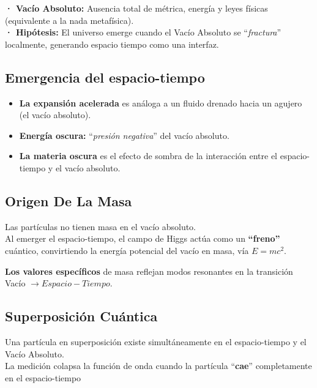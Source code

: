 \documentclass[a4paper]{article}
\theoremstyle{definition}
\theoremstyle{remark}
\numberwithin{equation}{section}
\begin{document}
	\textbf{· Vacío Absoluto:} Ausencia total de métrica, energía y leyes físicas (equivalente a la nada metafísica).\\
	
	\textbf{· Hipótesis:} El universo emerge cuando el Vacío Absoluto se ``\textit{fractura}'' localmente, generando espacio tiempo como una interfaz.
	
	\subsection{Emergencia del espacio-tiempo}
	
	\begin{itemize}
		\item \textbf{La expansión acelerada} es análoga a un fluido drenado hacia un agujero (el vacío absoluto).
		\item \textbf{Energía oscura:} ``\textit{presión negativa}'' del vacío absoluto.
		\item \textbf{La materia oscura} es el efecto de sombra de la interacción entre el espacio-tiempo y el vacío absoluto.
	\end{itemize}
	
	\subsection{Origen De La Masa}
	
	\begin{flushleft}
		Las partículas no tienen masa en el vacío absoluto.\\
		Al emerger el espacio-tiempo, el campo de Higgs actúa como un \textbf{``freno''} cuántico, convirtiendo la energía potencial del vacío en masa, vía \( E = mc^2 \).\\
		
		\item \textbf{Los valores específicos} de masa reflejan modos resonantes en la transición\\
		Vacío \(\rightarrow Espacio-Tiempo \).
	\end{flushleft}
	
	\subsection{Superposición Cuántica}
	
	\begin{flushleft}
		Una partícula en superposición existe simultáneamente en el espacio-tiempo y el Vacío Absoluto.\\
		La medición colapsa la función de onda cuando la partícula ``\textbf{cae}'' completamente en el espacio-tiempo
	\end{flushleft}
	
\end{document}
